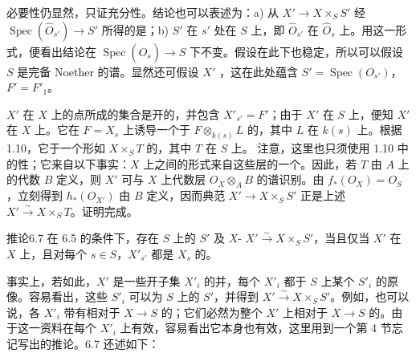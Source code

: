 必要性仍显然，只证充分性。结论也可以表述为：a) 从 $X'\to X\times_S S'$ 经 $\operatorname{Spec}(\widehat O_{s'})\to S'$ 所得的是；b) $S'$ 在 $s'$ 处在 $S$ 上，即 $\widehat O_{s'}$ 在 $\widehat O_s$ 上。用这一形式，便看出结论在 $\operatorname{Spec}(\widehat O_s)\to S$ 下不变。假设在此下也稳定，所以可以假设 $S$ 是完备 Noether 的谱。显然还可假设 $X'$ ，这在此处蕴含 $S'=\operatorname{Spec}(O_{s'})$，$F'=F'_1$。

$X'$ 在 $X$ 上的点所成的集合是开的，并包含 $X'_{s'}=F'$；由于 $X'$ 在 $S$ 上，便知 $X'$ 在 $X$ 上。它在 $F=X_s$ 上诱导一个于 $F\otimes_{k(s)}L$ 的，其中 $L$ 在 $k(s)$ 上。根据 1.10，它于一个形如 $X\times_S T$ 的，其中 $T$ 在 $S$ 上。
注意，这里也只须使用 1.10 中的性；它来自以下事实：$X$ 上之间的形式来自这些层的一个。因此，若 $T$ 由 $A$ 上的代数 $B$ 定义，则 $X'$ 可与 $X$ 上代数层 $O_X\otimes_A B$ 的谱识别。由 $f_*(O_X)=O_S$，立刻得到 $h_*(O_{X'})$ 由 $B$ 定义，因而典范 $X'\to X\times_S S'$ 正是上述 $X'\xrightarrow{\sim}X\times_S T$。证明完成。
\begin{SGAresult}{推论}{6.7}
在 6.5 的条件下，存在 $S$ 上的 $S'$ 及 $X$- $X'\xrightarrow{\sim}X\times_S S'$，当且仅当 $X'$ 在 $X$ 上，且对每个 $s\in S$，$X'_{s'}$ 都是 $X_s$ 的。
\end{SGAresult}
事实上，若如此，$X'$ 是一些开子集 $X'_i$ 的并，每个 $X'_i$ 都于 $S$ 上某个 $S'_i$ 的原像。容易看出，这些 $S'_i$ 可以为 $S$ 上的 $S'$，并得到 $X'\xrightarrow{\sim}X\times_S S'$。例如，也可以说，各 $X'_i$ 带有相对于 $X\to S$ 的；它们必然为整个 $X'$ 上相对于 $X\to S$ 的。由于这一资料在每个 $X'_i$ 上有效，容易看出它本身也有效，这里用到一个第 4 节忘记写出的推论。6.7 还述如下：
